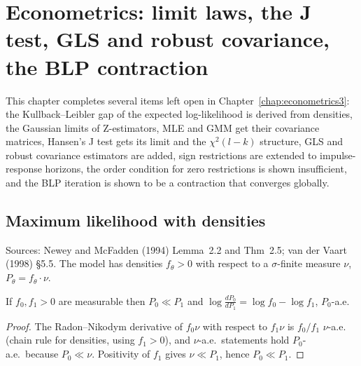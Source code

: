 \chapter{Econometrics: limit laws, the J test, GLS and robust covariance, the BLP contraction}
\label{chap:econometrics4}

This chapter completes several items left open in Chapter~\ref{chap:econometrics3}: the Kullback--Leibler gap of the
expected log-likelihood is derived from densities, the Gaussian limits of Z-estimators, MLE and GMM get their
covariance matrices, Hansen's J test gets its limit and the $\chi^2(l-k)$ structure, GLS and robust covariance
estimators are added, sign restrictions are extended to impulse-response horizons, the order condition for zero
restrictions is shown insufficient, and the BLP iteration is shown to be a contraction that converges globally.

\section{Maximum likelihood with densities}
\label{sec:mle-density}

Sources: Newey and McFadden (1994) Lemma~2.2 and Thm~2.5; van der Vaart (1998) \S5.5. The model has densities
$f_\theta > 0$ with respect to a $\sigma$-finite measure $\nu$, $P_\theta = f_\theta\cdot\nu$.

\begin{lemma}
\label{lem:llr-density}
\leanok
If $f_0, f_1 > 0$ are measurable then $P_0 \ll P_1$ and $\log\frac{dP_0}{dP_1} = \log f_0 - \log f_1$, $P_0$-a.e.
\end{lemma}
\begin{proof}
\leanok
The Radon--Nikodym derivative of $f_0\nu$ with respect to $f_1\nu$ is $f_0/f_1$ $\nu$-a.e. (chain rule for densities,
using $f_1 > 0$), and $\nu$-a.e.\ statements hold $P_0$-a.e.\ because $P_0 \ll \nu$. Positivity of $f_1$ gives
$\nu \ll P_1$, hence $P_0 \ll P_1$.
\end{proof}

